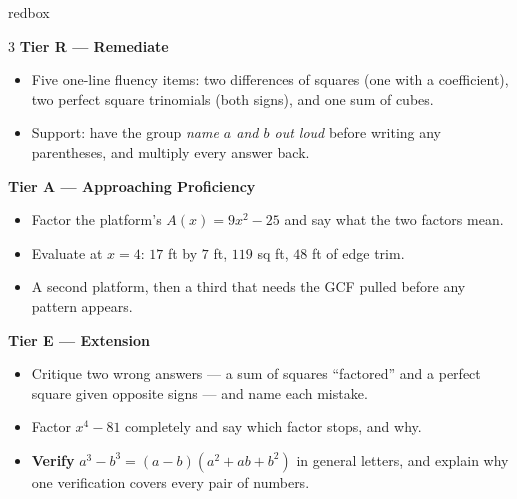 \documentclass[10pt]{article}
\begin{document}
\boxguard
\begin{skillbox}{redbox}
\begin{multicols}{3}
\textbf{Tier R --- Remediate}
\begin{itemize}[leftmargin=1em, itemsep=1pt, topsep=2pt]
  \item Five one-line fluency items: two differences of squares (one with a coefficient), two
        perfect square trinomials (both signs), and one sum of cubes.
  \item Support: have the group \emph{name $a$ and $b$ out loud} before writing any parentheses,
        and multiply every answer back.
\end{itemize}

\columnbreak
\textbf{Tier A --- Approaching Proficiency}
\begin{itemize}[leftmargin=1em, itemsep=1pt, topsep=2pt]
  \item Factor the platform's $A(x)=9x^2-25$ and say what the two factors mean.
  \item Evaluate at $x=4$: $17$ ft by $7$ ft, $119$ sq ft, $48$ ft of edge trim.
  \item A second platform, then a third that needs the GCF pulled before any pattern appears.
\end{itemize}

\columnbreak
\textbf{Tier E --- Extension}
\begin{itemize}[leftmargin=1em, itemsep=1pt, topsep=2pt]
  \item Critique two wrong answers --- a sum of squares ``factored'' and a perfect square given
        opposite signs --- and name each mistake.
  \item Factor $x^4-81$ completely and say which factor stops, and why.
  \item \textbf{Verify} $a^3-b^3=(a-b)(a^2+ab+b^2)$ in general letters, and explain why one
        verification covers every pair of numbers.
\end{itemize}
\end{multicols}
\end{skillbox}
\end{document}
